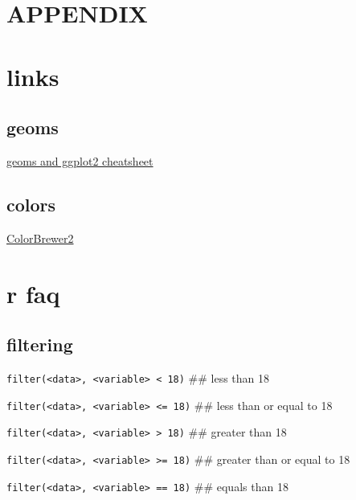 \documentclass[
]{krantz}
\begin{document}
\hypertarget{appendix}{%
\section*{APPENDIX}\label{appendix}}

\hypertarget{links}{%
\section{links}\label{links}}

\hypertarget{geoms-1}{%
\subsection{geoms}\label{geoms-1}}

\href{https://thebustalab.github.io/R_For_Chemists_3/images/ggplot2_geoms.pdf}{geoms and ggplot2 cheatsheet}

\hypertarget{colors}{%
\subsection{colors}\label{colors}}

\href{https://colorbrewer2.org/}{ColorBrewer2}

\hypertarget{r-faq}{%
\section{r faq}\label{r-faq}}

\hypertarget{filtering}{%
\subsection{filtering}\label{filtering}}

\texttt{filter(\textless{}data\textgreater{},\ \textless{}variable\textgreater{}\ \textless{}\ 18)} \#\# less than 18

\texttt{filter(\textless{}data\textgreater{},\ \textless{}variable\textgreater{}\ \textless{}=\ 18)} \#\# less than or equal to 18

\texttt{filter(\textless{}data\textgreater{},\ \textless{}variable\textgreater{}\ \textgreater{}\ 18)} \#\# greater than 18

\texttt{filter(\textless{}data\textgreater{},\ \textless{}variable\textgreater{}\ \textgreater{}=\ 18)} \#\# greater than or equal to 18

\texttt{filter(\textless{}data\textgreater{},\ \textless{}variable\textgreater{}\ ==\ 18)} \#\# equals than 18
\end{document}
